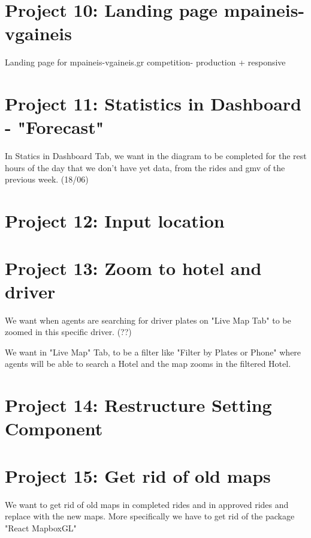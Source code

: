\section{Project 10: Landing page mpaineis-vgaineis}
Landing page for mpaineis-vgaineis.gr competition- production + responsive

\section{Project 11: Statistics in Dashboard - "Forecast"}
In Statics in Dashboard Tab, we want in the diagram to be completed for the rest hours of the day that we don't have yet data, from the rides and gmv of the previous week. (18/06)

\section{Project 12: Input location}


\section{Project 13: Zoom to hotel and driver}

We want when agents are searching for driver plates on "Live Map Tab" to be zoomed in this specific driver. (??)

We want in "Live Map" Tab, to be a filter like "Filter by Plates or Phone" where agents will be able to search a Hotel and the map zooms in the filtered Hotel.



\section{Project 14: Restructure Setting Component}

\section{Project 15: Get rid of old maps}

We want to get rid of old maps in completed rides and in approved rides and replace with the new maps. More specifically we have to get rid of the package "React MapboxGL"

